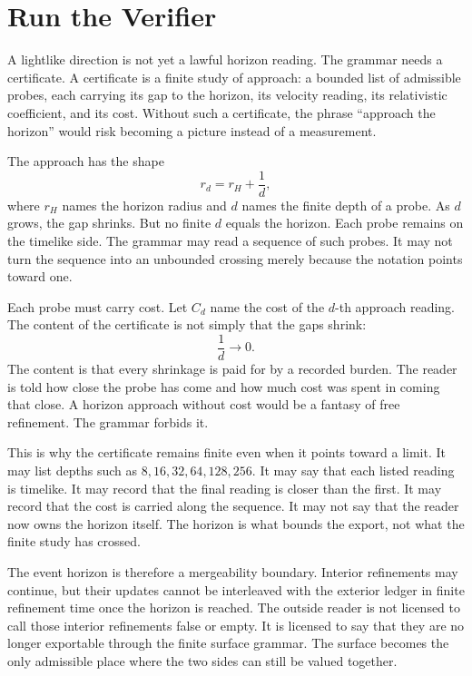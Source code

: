 \section{Run the Verifier}

A lightlike direction is not yet a lawful horizon reading. The grammar needs
a certificate. A certificate is a finite study of approach: a bounded list
of admissible probes, each carrying its gap to the horizon, its velocity
reading, its relativistic coefficient, and its cost. Without such a
certificate, the phrase ``approach the horizon'' would risk becoming a
picture instead of a measurement.

The approach has the shape
\[
  r_d = r_H + \frac{1}{d},
\]
where \(r_H\) names the horizon radius and \(d\) names the finite depth of a
probe. As \(d\) grows, the gap shrinks. But no finite \(d\) equals the
horizon. Each probe remains on the timelike side. The grammar may read a
sequence of such probes. It may not turn the sequence into an unbounded
crossing merely because the notation points toward one.

Each probe must carry cost. Let \(C_d\) name the cost of the \(d\)-th
approach reading. The content of the certificate is not simply that the
gaps shrink:
\[
  \frac{1}{d} \to 0.
\]
The content is that every shrinkage is paid for by a recorded burden. The
reader is told how close the probe has come and how much cost was spent in
coming that close. A horizon approach without cost would be a fantasy of
free refinement. The grammar forbids it.

This is why the certificate remains finite even when it points toward a
limit. It may list depths such as \(8,16,32,64,128,256\). It may say that
each listed reading is timelike. It may record that the final reading is
closer than the first. It may record that the cost is carried along the
sequence. It may not say that the reader now owns the horizon itself. The
horizon is what bounds the export, not what the finite study has crossed.

The event horizon is therefore a mergeability boundary. Interior
refinements may continue, but their updates cannot be interleaved with the
exterior ledger in finite refinement time once the horizon is reached. The
outside reader is not licensed to call those interior refinements false or
empty. It is licensed to say that they are no longer exportable through the
finite surface grammar. The surface becomes the only admissible place where
the two sides can still be valued together.


